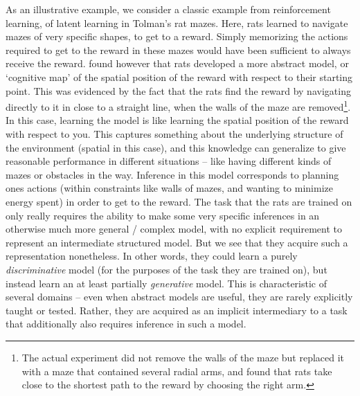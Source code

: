 As an illustrative example, we consider a classic example from reinforcement learning, of latent learning in Tolman's rat mazes\citep{tolman1948cognitive}. Here, rats learned to navigate mazes of very specific shapes, to get to a reward. Simply memorizing the actions required to get to the reward in these mazes would have been sufficient to always receive the reward. \citet{tolman1948cognitive} found however that rats developed a more abstract model, or `cognitive map' of the spatial position of the reward with respect to their starting point. This was evidenced by the fact that the rats find the reward by navigating directly to it in close to a straight line, when the walls of the maze are removed\footnote{The actual experiment did not remove the walls of the maze but replaced it with a maze that contained several radial arms, and found that rats take close to the shortest path to the reward by choosing the right arm.}. In this case, learning the model is like learning the spatial position of the reward with respect to you. This captures something about the underlying structure of the environment (spatial in this case), and this knowledge can generalize to give reasonable performance in different situations -- like having different kinds of mazes or obstacles in the way. Inference in this model corresponds to planning ones actions (within constraints like walls of mazes, and wanting to minimize energy spent) in order to get to the reward. The task that the rats are trained on only really requires the ability to make some very specific inferences in an otherwise much more general / complex model, with no explicit requirement to represent an intermediate structured model. But we see that they acquire such a representation nonetheless. In other words, they could learn a purely \textit{discriminative} model (for the purposes of the task they are trained on), but instead learn an at least partially \textit{generative} model. This is characteristic of several domains -- even when abstract models are useful, they are rarely explicitly taught or tested. Rather, they are acquired as an implicit intermediary to a task that additionally also requires inference in such a model.


